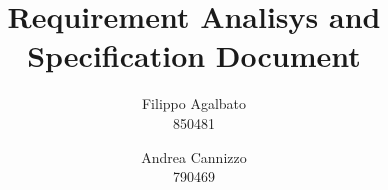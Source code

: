 \documentclass[a4paper]{report}
\begin{document}
\setcounter{tocdepth}{1}

\title{\Huge Requirement Analisys and Specification Document}
\author{Filippo Agalbato \\ 850481 \and Andrea Cannizzo \\ 790469}
\maketitle

\tableofcontents





\end{document}
